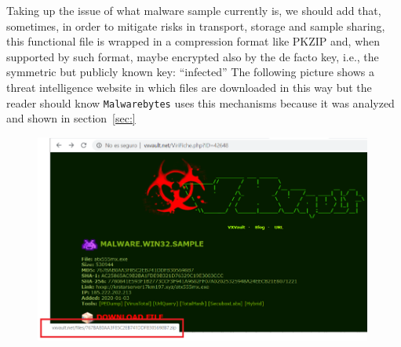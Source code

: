 Taking up the issue of what malware sample currently is, we should add that,
sometimes, in order to mitigate risks in transport, storage and sample
sharing, this functional file is wrapped in a compression format like PKZIP
and, when supported by such format, maybe encrypted also by the de facto key,
i.e., the symmetric but publicly known key:
``infected''\cite{ZeltserShareMalware}\cite{VXVault2020}\cite{VirusTotalFileSearch2020}\cite{MalShare2020}\cite{VirusShare2020}\cite{VirusBay2020} The following picture shows a
threat intelligence website in which files are downloaded in this way but the
reader should know \texttt{Malwarebytes} uses this mechanisms because it was
analyzed and shown in section~\ref{sec:}
\begin{figure}[h]
  \centering
  \includegraphics[width=0.99\textwidth]{./figures/ThreatWebsite}
\end{figure}

